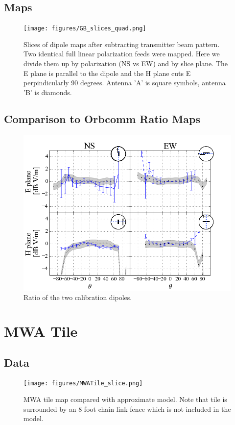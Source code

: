 \documentclass[preprint2,numberedappendix,tighten,twocolappendix]{aastex6}
\begin{document}
\subsection{Maps}




\begin{figure}[htb]
\begin{center}
\texttt{[image: figures/GB\_slices\_quad.png]}
\caption{Slices of dipole maps after subtracting transmitter beam pattern. Two identical full linear polarization feeds were mapped.  Here we divide them up by polarization (NS vs EW) and by slice plane. The E plane is parallel to the dipole  and the H plane cuts E perpindicularly 90 degrees.  Antenna 'A' is square symbols, antenna 'B' is diamonds. }
\end{center}
\end{figure}

\subsection{Comparison to Orbcomm Ratio Maps}

\begin{figure}[htb]
\includegraphics[width=\columnwidth]{figures/GB_ratio_slice_5dB.png}
\caption{Ratio of the two calibration dipoles.  }
\end{figure}


\section{MWA Tile}

\subsection{Data}
\begin{figure}[htb]
\texttt{[image: figures/MWATile\_slice.png]}
\caption{MWA tile map compared with approximate model. Note that tile is surrounded by an 8 foot chain link fence which is not included in the model.}
\end{figure}
\end{document}
